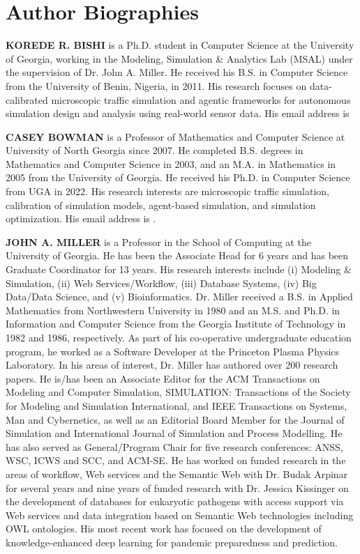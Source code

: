 \documentclass{scspaperproc}
\theoremstyle{scsthe}
\begin{document}


\section*{Author Biographies}
\enlargethispage{4\baselineskip}
\textbf{\uppercase{Korede R. Bishi}} is a Ph.D. student in Computer Science at the University of Georgia, working in the Modeling, Simulation \& Analytics Lab (MSAL) under the supervision of Dr. John A. Miller. He received his B.S. in Computer Science from the University of Benin, Nigeria, in 2011. His research focuses on data-calibrated microscopic traffic simulation and agentic frameworks for autonomous simulation design and analysis using real-world sensor data. His email address is 

\textbf{\uppercase{Casey Bowman}} is a Professor of Mathematics and Computer Science at University of North Georgia since 2007. He completed B.S. degrees in Mathematics and Computer Science in 2003, and an M.A. in Mathematics in 2005 from the University of Georgia. He received his Ph.D. in Computer Science from UGA in 2022. His research interests are microscopic traffic simulation, calibration of simulation models, agent-based simulation, and simulation optimization. His email address is .


\textbf{\uppercase{John A. Miller}} is a Professor in the School of Computing at the University of Georgia.  He has been the Associate Head for 6 years and has been Graduate Coordinator for 13 years.  His research interests include (i) Modeling \& Simulation, (ii) Web Services/Workflow, (iii) Database Systems, (iv) Big Data/Data Science, and (v) Bioinformatics.  Dr. Miller received a B.S. in Applied Mathematics from Northwestern University in 1980 and an M.S. and Ph.D. in Information and Computer Science from the Georgia Institute of Technology in 1982 and 1986, respectively.  As part of his co-operative undergraduate education program, he worked as a Software Developer at the Princeton Plasma Physics Laboratory.  In his areas of interest, Dr. Miller has authored over 200 research papers.  He is/has been an Associate Editor for the ACM Transactions on Modeling and Computer Simulation, SIMULATION: Transactions of the Society for Modeling and Simulation International, and IEEE Transactions on Systems, Man and Cybernetics, as well as an Editorial Board Member for the Journal of Simulation and International Journal of Simulation and Process Modelling.  He has also served as General/Program Chair for five research conferences: ANSS, WSC, ICWS and SCC, and ACM-SE.  He has worked on funded research in the areas of workflow, Web services and the Semantic Web with Dr. Budak Arpinar for several years and nine years of funded research with Dr. Jessica Kissinger on the development of databases for eukaryotic pathogens with access support via Web services and data integration based on Semantic Web technologies including OWL ontologies.  His most recent work has focused on the development of knowledge-enhanced deep learning for pandemic preparedness and prediction.
\end{document}
